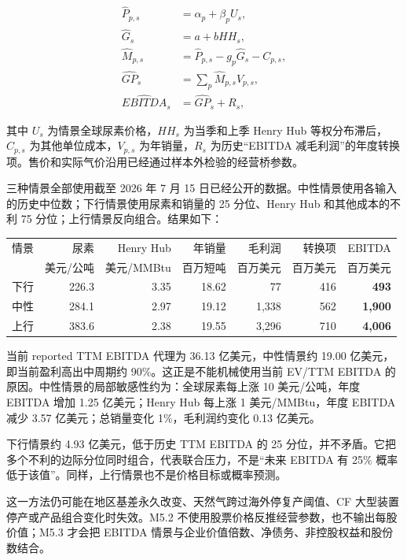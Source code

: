 \documentclass[11pt,a4paper]{ctexart}
\begin{document}
\begin{align*}
\widehat P_{p,s} &= \alpha_p+\beta_p U_s, \\
\widehat G_s &= a+bHH_s, \\
\widehat M_{p,s} &= \widehat P_{p,s}-g_p\widehat G_s-C_{p,s}, \\
\widehat{GP}_s &= \sum_p \widehat M_{p,s}V_{p,s}, \\
\widehat{EBITDA}_s &= \widehat{GP}_s+R_s,
\end{align*}

其中 $U_s$ 为情景全球尿素价格，$HH_s$ 为当季和上季 Henry Hub 等权分布滞后，$C_{p,s}$ 为其他单位成本，$V_{p,s}$ 为年销量，$R_s$ 为历史“EBITDA 减毛利润”的年度转换项。售价和实际气价沿用已经通过样本外检验的经营桥参数。

三种情景全部使用截至 2026 年 7 月 15 日已经公开的数据。中性情景使用各输入的历史中位数；下行情景使用尿素和销量的 25 分位、Henry Hub 和其他成本的不利 75 分位；上行情景反向组合。结果如下：

\begin{center}
\small
\begin{tabularx}{\textwidth}{L{1.6cm}r r r r r r}
\toprule
情景 & 尿素 & Henry Hub & 年销量 & 毛利润 & 转换项 & EBITDA \\
 & 美元/公吨 & 美元/MMBtu & 百万短吨 & 百万美元 & 百万美元 & 百万美元 \\
\midrule
下行 & 226.3 & 3.35 & 18.62 & 77 & 416 & \textbf{493} \\
中性 & 284.1 & 2.97 & 19.12 & 1,338 & 562 & \textbf{1,900} \\
上行 & 383.6 & 2.38 & 19.55 & 3,296 & 710 & \textbf{4,006} \\
\bottomrule
\end{tabularx}
\normalsize
\end{center}

当前 reported TTM EBITDA 代理为 36.13 亿美元，中性情景约 19.00 亿美元，即当前盈利高出中周期约 90\%。这正是不能机械使用当前 EV/TTM EBITDA 的原因。中性情景的局部敏感性约为：全球尿素每上涨 10 美元/公吨，年度 EBITDA 增加 1.25 亿美元；Henry Hub 每上涨 1 美元/MMBtu，年度 EBITDA 减少 3.57 亿美元；总销量变化 1\%，毛利润约变化 0.13 亿美元。

下行情景约 4.93 亿美元，低于历史 TTM EBITDA 的 25 分位，并不矛盾。它把多个不利的边际分位同时组合，代表联合压力，不是“未来 EBITDA 有 25\% 概率低于该值”。同样，上行情景也不是价格目标或概率预测。

这一方法仍可能在地区基差永久改变、天然气跨过海外停复产阈值、CF 大型装置停产或产品组合变化时失效。M5.2 不使用股票价格反推经营参数，也不输出每股价值；M5.3 才会把 EBITDA 情景与企业价值倍数、净债务、非控股权益和股份数结合。
\end{document}
